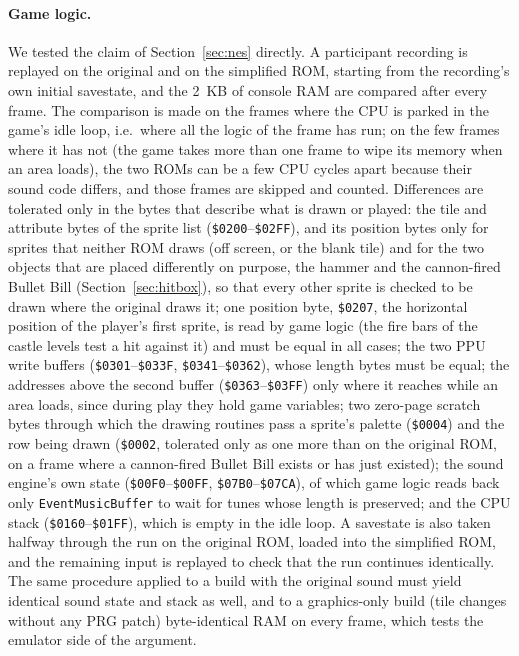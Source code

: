 \documentclass{article}
\newcommand{\hex}[1]{\texttt{\$#1}}
\begin{document}
\paragraph{Game logic.} We tested the claim of Section~\ref{sec:nes} directly. A participant
recording is replayed on the original and on the simplified ROM, starting from the recording's own
initial savestate, and the 2~KB of console RAM are compared after every frame. The comparison is
made on the frames where the CPU is parked in the game's idle loop, i.e.\ where all the logic of
the frame has run; on the few frames where it has not (the game takes more than one frame to wipe
its memory when an area loads), the two ROMs can be a few CPU cycles apart because their sound
code differs, and those frames are skipped and counted. Differences are tolerated only in the
bytes that describe what is drawn or played: the tile and attribute bytes of the sprite list
(\hex{0200}--\hex{02FF}), and its position bytes only for sprites that neither ROM draws (off
screen, or the blank tile) and for the two objects that are placed differently on purpose, the
hammer and the cannon-fired Bullet Bill (Section~\ref{sec:hitbox}), so that every other sprite is
checked to be drawn where the original draws it; one position byte, \hex{0207}, the horizontal
position of the player's first sprite, is read by game logic (the fire bars of the castle levels
test a hit against it) and must be equal in all cases; the two PPU
write buffers (\hex{0301}--\hex{033F}, \hex{0341}--\hex{0362}), whose length bytes must be equal;
the addresses above the second buffer (\hex{0363}--\hex{03FF}) only where it reaches while an area
loads, since during play they hold game variables; two zero-page scratch bytes through which the
drawing routines pass a sprite's palette (\hex{0004}) and the row being drawn (\hex{0002}, tolerated
only as one more than on the original ROM, on a frame where a cannon-fired Bullet Bill exists or
has just existed); the sound engine's own state
(\hex{00F0}--\hex{00FF}, \hex{07B0}--\hex{07CA}), of which game logic reads back only
\texttt{EventMusicBuffer} to wait for tunes whose length is preserved; and the CPU stack
(\hex{0160}--\hex{01FF}), which is empty in the idle loop. A savestate is also taken halfway
through the run on the original ROM, loaded into the simplified ROM, and the remaining input is
replayed to check that the run continues identically. The same procedure applied to a build with
the original sound must yield identical sound state and stack as well, and to a graphics-only
build (tile changes without any PRG patch) byte-identical RAM on every frame, which tests the
emulator side of the argument.
\end{document}
